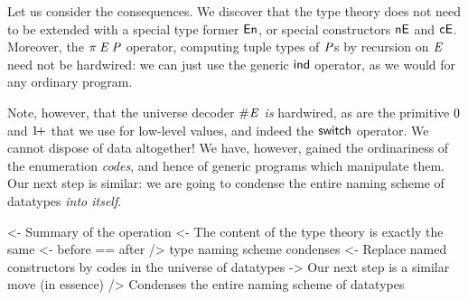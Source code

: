 Let us consider the consequences. We discover that the type
theory does not need to be extended with a special type former $\EnumU$,
or special constructors $\NilE$ and $\SYMBConsE$. 
Moreover, the $\spi{\M{E}}{\M{P}}$ operator, computing tuple types
of \(\mathit{P}\)s by recursion on \(\mathit{E}\) need not be hardwired: we can
just use the generic $\F{ind}$ operator, as we would for any ordinary
program.

Note, however, that the universe decoder \(\EnumT{\M{E}}\) \emph{is}
hardwired, as are the primitive \(\Ze\) and \(\Su\) that
we use for low-level values, and indeed the \(\SYMBswitch\) operator.
We cannot dispose of data altogether! We have, however, gained
the ordinariness of the enumeration \emph{codes}, and hence of generic
programs which manipulate them. Our next step is similar: we are going to
condense the entire naming scheme of datatypes \emph{into itself}.


\begin{wstructure}
<- Summary of the operation
    <- The content of the type theory is exactly the same
        <- before == after
    /> type naming scheme condenses
        <- Replace named constructors by codes in the universe of datatypes
    -> Our next step is a similar move (in essence)
        /> Condenses the entire naming scheme of datatypes
\end{wstructure}



